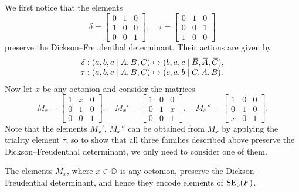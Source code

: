 We first notice that the elements 
\begin{equation}
	\label{eq:delta_tau}
	\delta = \begin{bmatrix}
		0 & 1 & 0 \\
		1 & 0 & 0 \\
		0 & 0 & 1
	\end{bmatrix},\quad 
	\tau = \begin{bmatrix}
		0 & 1 & 0 \\
		0 & 0 & 1 \\
		1 & 0 & 0
	\end{bmatrix}
\end{equation}
preserve the Dickson--Freudenthal determinant. Their actions are given by
\begin{equation}
	\begin{array}{r@{\;}c@{\;}l}
		\delta: (a,b,c\mid A,B,C) & \mapsto & (b,a,c\mid \ovB, \ovA, \ovC), \\
		\tau: (a,b,c\mid A,B,C) & \mapsto & (c,a,b\mid C,A,B). 
	\end{array}
\end{equation}
Now let $x$ be any octonion and consider the matrices
\begin{equation}
	M_x = \begin{bmatrix}
		1 & x & 0 \\
		0 & 1 & 0 \\
		0 & 0 & 1 
	\end{bmatrix},\quad 
	M_x' = \begin{bmatrix}
		1 & 0 & 0 \\
		0 & 1 & x \\
		0 & 0 & 1
	\end{bmatrix},\quad 
	M_x'' = \begin{bmatrix}
		1 & 0 & 0 \\
		0 & 1 & 0 \\
		x & 0 & 1
	\end{bmatrix}.
\end{equation}
Note that the elements $M_x'$, $M_x''$ can be obtained from $M_x$ by applying 
the triality element $\tau$, so to show that all three families described above preserve
the Dickson--Freudenthal determinant, we only need to consider one of them. 

\begin{lemma}
	\label{lemma:Mx_det}
	The elements $M_x$, where $x \in \mathbb{O}$ is any octonion, preserve the Dickson--Freudenthal
	determinant, and hence they encode elements of $\mathrm{SE}_6(F)$. 
\end{lemma} 

